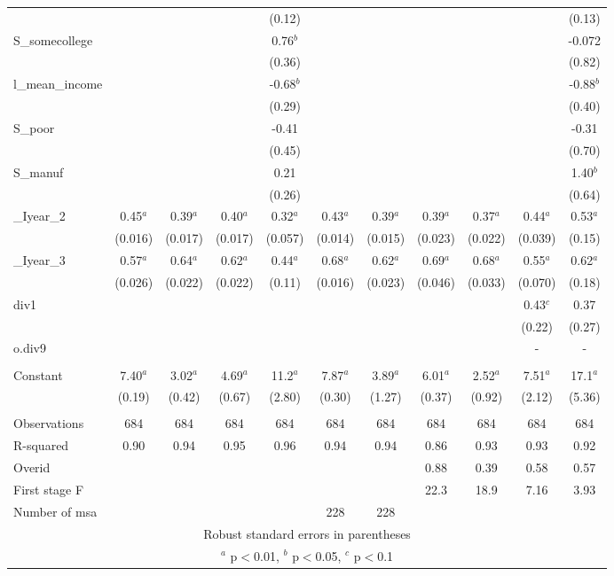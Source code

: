 \documentclass[]{article}
\begin{document}
\begin{tabular}{lcccccccccc}
 &  &  &  & (0.12) &  &  &  &  &  & (0.13) \\
S\_somecollege &  &  &  & 0.76$^b$ &  &  &  &  &  & -0.072 \\
 &  &  &  & (0.36) &  &  &  &  &  & (0.82) \\
l\_mean\_income &  &  &  & -0.68$^b$ &  &  &  &  &  & -0.88$^b$ \\
 &  &  &  & (0.29) &  &  &  &  &  & (0.40) \\
S\_poor &  &  &  & -0.41 &  &  &  &  &  & -0.31 \\
 &  &  &  & (0.45) &  &  &  &  &  & (0.70) \\
S\_manuf &  &  &  & 0.21 &  &  &  &  &  & 1.40$^b$ \\
 &  &  &  & (0.26) &  &  &  &  &  & (0.64) \\
\_Iyear\_2 & 0.45$^a$ & 0.39$^a$ & 0.40$^a$ & 0.32$^a$ & 0.43$^a$ & 0.39$^a$ & 0.39$^a$ & 0.37$^a$ & 0.44$^a$ & 0.53$^a$ \\
 & (0.016) & (0.017) & (0.017) & (0.057) & (0.014) & (0.015) & (0.023) & (0.022) & (0.039) & (0.15) \\
\_Iyear\_3 & 0.57$^a$ & 0.64$^a$ & 0.62$^a$ & 0.44$^a$ & 0.68$^a$ & 0.62$^a$ & 0.69$^a$ & 0.68$^a$ & 0.55$^a$ & 0.62$^a$ \\
 & (0.026) & (0.022) & (0.022) & (0.11) & (0.016) & (0.023) & (0.046) & (0.033) & (0.070) & (0.18) \\
div1 &  &  &  &  &  &  &  &  & 0.43$^c$ & 0.37 \\
 &  &  &  &  &  &  &  &  & (0.22) & (0.27) \\
o.div9 &  &  &  &  &  &  &  &  & - & - \\
 &  &  &  &  &  &  &  &  &  &  \\
Constant & 7.40$^a$ & 3.02$^a$ & 4.69$^a$ & 11.2$^a$ & 7.87$^a$ & 3.89$^a$ & 6.01$^a$ & 2.52$^a$ & 7.51$^a$ & 17.1$^a$ \\
 & (0.19) & (0.42) & (0.67) & (2.80) & (0.30) & (1.27) & (0.37) & (0.92) & (2.12) & (5.36) \\
 &  &  &  &  &  &  &  &  &  &  \\
Observations & 684 & 684 & 684 & 684 & 684 & 684 & 684 & 684 & 684 & 684 \\
R-squared & 0.90 & 0.94 & 0.95 & 0.96 & 0.94 & 0.94 & 0.86 & 0.93 & 0.93 & 0.92 \\
Overid &  &  &  &  &  &  & 0.88 & 0.39 & 0.58 & 0.57 \\
First stage F &  &  &  &  &  &  & 22.3 & 18.9 & 7.16 & 3.93 \\
 Number of msa &  &  &  &  & 228 & 228 &  &  &  &  \\ \hline
\multicolumn{11}{c}{ Robust standard errors in parentheses} \\
\multicolumn{11}{c}{ $^a$ p$<$0.01, $^b$ p$<$0.05, $^c$ p$<$0.1} \\
\end{tabular}
\end{document}
